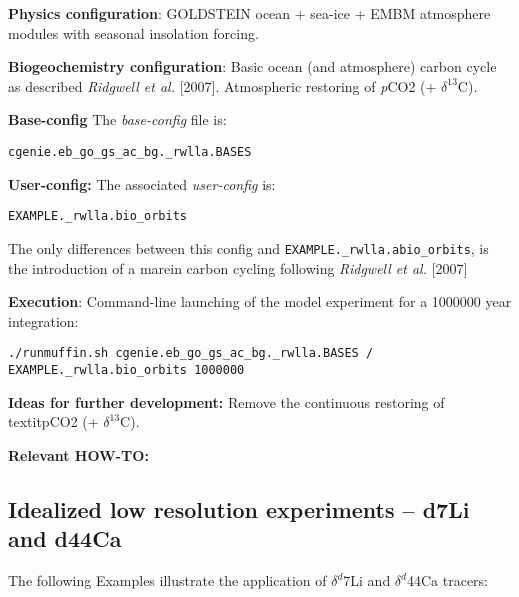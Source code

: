 \documentclass[10pt,twoside]{article}
\begin{document}
\noindent \textbf{Physics configuration}: GOLDSTEIN ocean + sea-ice + EMBM atmosphere modules with seasonal insolation forcing.

\noindent \textbf{Biogeochemistry configuration}: Basic ocean (and atmosphere) carbon cycle as described \textit{Ridgwell et al.} [2007]. Atmospheric restoring of \textit{p}CO2 (+ $\delta^{13}$C).

\noindent \textbf{Base-config} The \textit{base-config} file is:
\vspace{-10pt}\begin{verbatim}cgenie.eb_go_gs_ac_bg._rwlla.BASES\end{verbatim}\vspace{-10pt}

\noindent \textbf{User-config:} The associated \textit{user-config} is:
\vspace{-10pt}\begin{verbatim}EXAMPLE._rwlla.bio_orbits\end{verbatim}\vspace{-10pt}
The only differences between this config and \texttt{EXAMPLE.\_rwlla.abio\_orbits}, is the introduction of a marein carbon cycling following \textit{Ridgwell et al.} [2007]

\noindent \textbf{Execution}: Command-line launching of the model experiment for a 1000000 year integration:
\vspace{-10pt}\begin{verbatim}./runmuffin.sh cgenie.eb_go_gs_ac_bg._rwlla.BASES /
EXAMPLE._rwlla.bio_orbits 1000000\end{verbatim}\vspace{-10pt}

\noindent \textbf{Ideas for further development:} 
Remove the continuous restoring of textit{p}CO2 (+ $\delta^{13}$C).

\noindent \textbf{Relevant HOW-TO:} 


\subsection{Idealized low resolution experiments -- d7Li and d44Ca}

The following Examples illustrate the application of $\delta^{d}$7Li and $\delta^{d}$44Ca tracers:
\end{document}
